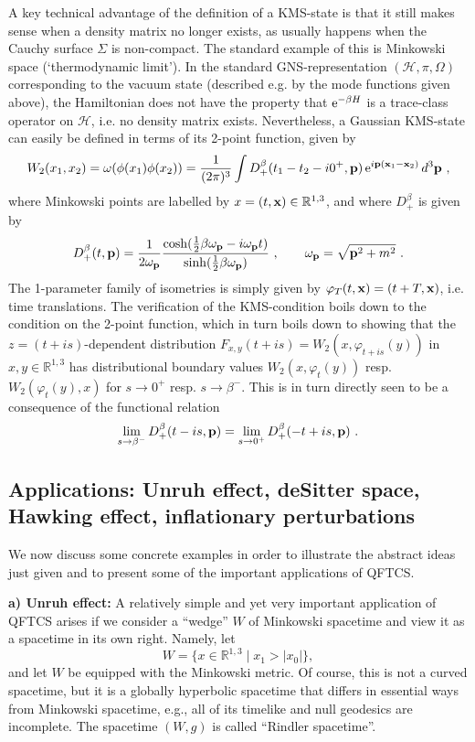 \documentclass[12pt]{article}
\newcommand{\half}{\tfrac12}
\newcommand{\RR}{\mathbb{R}}
\newcommand{\eH}{\mathscr{H}}
\renewcommand{\half}{\tfrac{1}{2}}
\newcommand{\e}{{\rm e}}
\theoremstyle{plain}
\theoremstyle{definition}
\def\ben{\begin{equation}}
\def\een{\end{equation}}
\begin{document}
A key technical advantage of the definition of a KMS-state is that it
still makes sense when a density matrix no longer exists, as usually
happens when the Cauchy surface $\Sigma$ is non-compact. The standard example of
this is Minkowski space (`thermodynamic limit'). In the standard GNS-representation $(\eH, \pi, \Omega)$ corresponding
to the vacuum state (described e.g. by the mode functions given above), the Hamiltonian
does not have the property that $\e^{-\beta H}$ is a trace-class operator on $\eH$, i.e.
no density matrix exists. Nevertheless, a Gaussian KMS-state can easily be defined in
terms of its 2-point function, given by
\ben\label{KMS0}
W_2(x_1,x_2) = \omega(\phi(x_1)\phi(x_2)) =
\frac{1}{(2\pi)^3} \int D^\beta_+(t_1-t_2-i0^+,{\bf p}) \, \e^{i{\bf p}({\bf x}_1-{\bf x}_2)} \, d^3 {\bf p} \ ,
\een
where Minkowski points are labelled by $x = (t, {\bf x}) \in \RR^{1,3}$, and where $D^\beta_+$ is given by
\ben\label{Ddef}
D^\beta_+(t,{\bf p}) = \frac{1}{2 \omega_{\bf p}} \frac{\cosh(\half \beta \omega_{\bf p} - i\omega_{\bf p}t)}{\sinh(\half \beta \omega_{\bf p})} \ ,
\qquad \omega_{\bf p} = \sqrt{{\bf p}^2 + m^2} \ .
\een
The 1-parameter family of isometries is simply given by $\varphi_T(t,{\bf x}) = (t+T,{\bf x})$, i.e. time translations.
The verification of the KMS-condition boils down to the condition on the 2-point function, which in
turn boils down to showing that the $z=(t+is)$-dependent distribution
$F_{x,y}(t+is) = W_2(x, \varphi_{t+is}(y))$ in $x,y \in \RR^{1,3}$ has distributional boundary
values $W_2(x,\varphi_t(y))$ resp. $W_2(\varphi_t(y), x)$ for $s \to 0^+$ resp. $s \to \beta^-$. This is
in turn directly seen to be a consequence of the functional relation
\ben
\lim_{s \to \beta^-} D^\beta_+(t-is,{\bf p}) = \lim_{s \to 0^+} D^\beta_+(-t+is,{\bf p})  \ .
\een


\subsection{Applications: Unruh effect, deSitter space, Hawking effect, inflationary perturbations}

We now discuss some concrete examples in order to illustrate the abstract ideas just given and to
present some of the important applications of QFTCS.

\vspace{.5cm}
%
{\bf a) Unruh effect:} A relatively simple and yet very important application of QFTCS
arises if we consider a ``wedge'' $W$ of Minkowski
spacetime and view it as a spacetime in its own right. Namely, let
\ben
W = \{x \in \RR^{1,3} \mid x_1 > |x_0| \},
\een
and
let $W$ be equipped with the Minkowski metric. Of course, this is not a curved spacetime, but
it is a globally hyperbolic spacetime that differs in essential ways from
Minkowski spacetime, e.g., all of its timelike and null geodesics are incomplete. The spacetime $(W, g)$ is called ``Rindler spacetime''.
\end{document}
